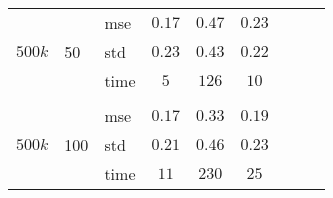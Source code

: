 \documentclass{article} %
\begin{document}
\begin{table}[t]
\begin{center}
\begin{small}
\begin{sc}
\begin{tabular}{lllcccccc}
\multirow{3}{*}{$500k$}&\multirow{3}{*}{50}&mse &$0.17$&$0.47$&$0.23$\\
&&std & $0.23$ & $0.43$&$0.22$\\
&&time &$5$ &$126$&$10$  \\

\\
\multirow{3}{*}{$500k$}&\multirow{3}{*}{100}&mse &$0.17$&$0.33$&$0.19$\\
&&std & $0.21$ &$0.46$ &$0.23$\\
&&time &$11$ &$230$&$25$\\



\hline
\end{tabular}
\end{sc}
\end{small}
\end{center}
\vskip -0.1in
\end{table}



 
 
\end{document}
